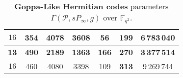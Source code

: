 \documentclass[
10pt, %
%
aspectratio=169, %
]{beamer}
\theoremstyle{plain}%
\theoremstyle{definition}
\theoremstyle{remark}
\newcommand{\calP}{\mathcal{P}}
\newcommand{\F}{\mathbb{F}}
\begin{document}
\begin{frame}
\begin{table}[h]
\begin{center}
{\begin{tabular}{|c|c|c|c|c|c|c|}
				\hline 
				${16}$&354& 4078& 3608& 56& \cellcolor{applegreen}\textbf{199}& 6\,783\,040   \\
				
				\hline \hline
				\rowcolor{applegreen}\textbf{13}& \textbf{490}& \textbf{2189}& \textbf{1363}& \textbf{166}& \textbf{270}& \textbf{3\,377\,514} \\
				
				\hline 
				${16}$& 460 &4080& 3398& 109& \cellcolor{applegreen}\textbf{313}& 9\,269\,744\\
				\hline
			\end{tabular}}
			\caption{\textbf{Goppa-Like Hermitian codes }parameters $\Gamma(\calP,sP_\infty,g)$ over $\F_{q^2}$.} \label{table:goppa-herm}
		\end{center}
	\end{table}
\vspace*{-0.8em}
\end{frame}
\end{document}
